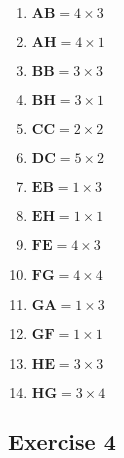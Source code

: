 \documentclass[11pt]{article}
\begin{document}
\begin{enumerate}[1.)]
	\item $\textbf{AB}=4 \times 3$
	\item $\textbf{AH}=4 \times 1$
	\item $\textbf{BB}=3 \times 3$
	\item $\textbf{BH}=3 \times 1$
	\item $\textbf{CC}=2 \times 2$
	\item $\textbf{DC}=5 \times 2$
	\item $\textbf{EB}=1 \times 3$
	\item $\textbf{EH}=1 \times 1$
	\item $\textbf{FE}=4 \times 3$
	\item $\textbf{FG}=4 \times 4$
	\item $\textbf{GA}=1 \times 3$
	\item $\textbf{GF}=1 \times 1$
	\item $\textbf{HE}=3 \times 3$
	\item $\textbf{HG}=3 \times 4$
\end{enumerate}

\subsection{Exercise 4}
\end{document}
